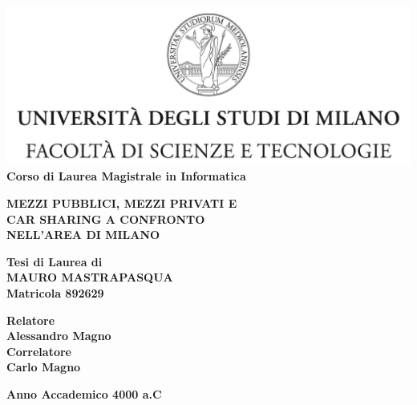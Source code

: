 \documentclass[a4paper]{report}
\begin{document}
	\begin{titlepage}
		\begin{center}
			\includegraphics[width=\textwidth]{Logo.jpg}\\
			{\large{\bf Corso di Laurea Magistrale in Informatica}}
		\end{center}
	
		\vspace{14mm}
		\begin{center}
			{\LARGE{\bf MEZZI PUBBLICI, MEZZI PRIVATI E}}\\
			\vspace{3mm}
			{\LARGE{\bf CAR SHARING A CONFRONTO}}\\
			\vspace{4mm}
			{\LARGE{\bf NELL'AREA DI MILANO}}\\
		\end{center}
	
		\vspace{14mm}
		\begin{center}
			{\large{\bf Tesi di Laurea di}}\\
			\vspace{3mm}
			{\Large{\bf MAURO MASTRAPASQUA}}\\
			\vspace{2mm}
			{\large{\bf Matricola 892629}}\\
		\end{center}
	
		\vspace{14mm}
		\begin{flushleft}
			{\normalsize{\bf Relatore}}\\
			\vspace{1mm}
			{\large{\bf Alessandro Magno}}\\
			\vspace{4mm}
			{\normalsize{\bf Correlatore}}\\
			\vspace{1mm}
			{\large{\bf Carlo Magno}}\\
		\end{flushleft}
	
		\vspace{14mm}
		\begin{center}
			{\large{\bf Anno Accademico 4000 a.C}}
		\end{center}
	\end{titlepage}
\end{document}
